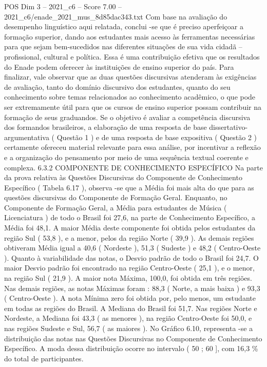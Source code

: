 \begin{textsample}{POS Dim 3 – 2021\_c6 – Score 7.00 – 2021\_c6/enade\_2021\_mus\_8d85dac343.txt}
Com base na avaliação do desempenho linguístico aqui relatada, conclui -se que é preciso aperfeiçoar a formação superior, dando aos estudantes mais acesso às ferramentas necessárias para que sejam bem-sucedidos nas diferentes situações de sua vida cidadã – profissional, cultural e política.
Essa é uma contribuição efetiva que os resultados do Enade podem oferecer às instituições de ensino superior do país.
Para finalizar, vale observar que as duas questões discursivas atenderam às exigências de avaliação, tanto do domínio discursivo dos estudantes, quanto do seu conhecimento sobre temas relacionados ao conhecimento acadêmico, o que pode ser extremamente útil para que os cursos de ensino superior possam contribuir na formação de seus graduandos.
Se o objetivo é avaliar a competência discursiva dos formandos brasileiros, a elaboração de uma resposta de base dissertativo-argumentativa ( Questão 1 ) e de uma resposta de base expositiva ( Questão 2 ) certamente ofereceu material relevante para essa análise, por incentivar a reflexão e a organização do pensamento por meio de uma sequência textual coerente e complexa. 6.3.2 COMPONENTE DE CONHECIMENTO ESPECÍFICO Na parte da prova relativa às Questões Discursivas do Componente de Conhecimento Específico ( Tabela 6.17 ), observa -se que a Média foi mais alta do que para as questões discursivas do Componente de Formação Geral.
Enquanto, no Componente de Formação Geral, a Média para estudantes de Música ( Licenciatura ) de todo o Brasil foi 27,6, na parte de Conhecimento Específico, a Média foi 48,1.
A maior Média deste componente foi obtida pelos estudantes da região Sul ( 53,8 ), e a menor, pelos da região Norte ( 39,9 ).
As demais regiões obtiveram Média igual a 40,6 ( Nordeste ), 51,3 ( Sudeste ) e 48,2 ( Centro-Oeste ).
Quanto à variabilidade das notas, o Desvio padrão de todo o Brasil foi 24,7.
O maior Desvio padrão foi encontrado na região Centro-Oeste ( 25,1 ), e o menor, na região Sul ( 21,9 ).
A maior nota Máxima, 100,0, foi obtida em três regiões.
Nas demais regiões, as notas Máximas foram : 88,3 ( Norte, a mais baixa ) e 93,3 ( Centro-Oeste ).
A nota Mínima zero foi obtida por, pelo menos, um estudante em todas as regiões do Brasil.
A Mediana do Brasil foi 51,7.
Nas regiões Norte e Nordeste, a Mediana foi 43,3 ( as menores ), na região Centro-Oeste foi 50,0, e nas regiões Sudeste e Sul, 56,7 ( as maiores ).
No Gráfico 6.10, representa -se a distribuição das notas nas Questões Discursivas no Componente de Conhecimento Específico.
A moda dessa distribuição ocorre no intervalo ( 50 ; 60 ], com 16,3 \% do total de participantes.

\end{textsample}
